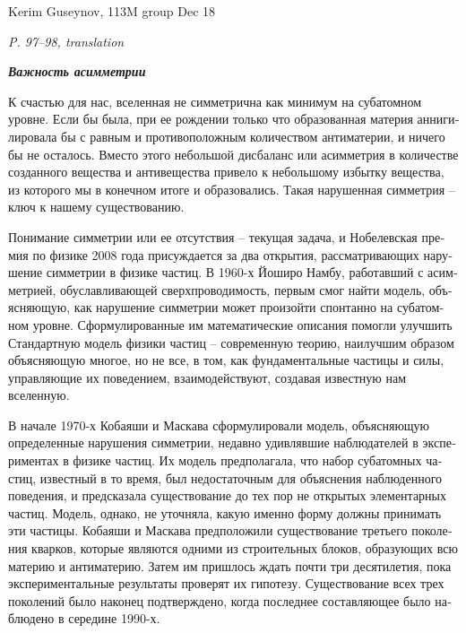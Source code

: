 \documentclass[a4paper, 12pt]{article}
\def\task#1{\begin{center}\it #1\end{center}}
\begin{document}
\noindent
Kerim Guseynov, 113M group
\hfill
Dec 18

\task{P. 97--98, translation}

\begin{otherlanguage}{russian}
	\textbf{\textit{\large Важность асимметрии}}

	К счастью для нас, вселенная не симметрична как минимум на субатомном 
	уровне. Если бы была, при ее рождении только что образованная материя 
	аннигилировала бы с равным и противоположным количеством антиматерии, 
	и ничего бы не осталось. Вместо этого небольшой дисбаланс или 
	асимметрия в количестве созданного вещества и антивещества привело 
	к небольшому избытку вещества, из которого мы в конечном итоге 
	и образовались. Такая нарушенная симметрия -- ключ к нашему 
	существованию.

	Понимание симметрии или ее отсутствия -- текущая задача, 
	и Нобелевская премия по физике 2008 года присуждается за два 
	открытия, рассматривающих нарушение симметрии в физике частиц. 
	В 1960-х Йоширо Намбу, работавший с асимметрией, обуславливающей 
	сверхпроводимость, первым смог найти модель, объясняющую, как 
	нарушение симметрии может произойти спонтанно на субатомном уровне. 
	Сформулированные им математические описания помогли улучшить 
	Стандартную модель физики частиц -- современную теорию, наилучшим 
	образом объясняющую многое, но не все, в том, как фундаментальные 
	частицы и силы, управляющие их поведением, взаимодействуют, создавая 
	известную нам вселенную.

	В начале 1970-х Кобаяши и Маскава сформулировали модель, объясняющую 
	определенные нарушения симметрии, недавно удивлявшие наблюдателей 
	в экспериментах в физике частиц. Их модель предполагала, что набор 
	субатомных частиц, известный в то время, был недостаточным для 
	объяснения наблюденного поведения, и предсказала существование до тех 
	пор не открытых элементарных частиц. Модель, однако, не уточняла, 
	какую именно форму должны принимать эти частицы. Кобаяши и Маскава 
	предположили существование третьего поколения кварков, которые 
	являются одними из строительных блоков, образующих всю материю 
	и антиматерию. Затем им пришлось ждать почти три десятилетия, пока 
	экспериментальные результаты проверят их гипотезу. Существование всех 
	трех поколений было наконец подтверждено, когда последнее 
	составляющее было наблюдено в середине 1990-х.
\end{otherlanguage}
\end{document}
